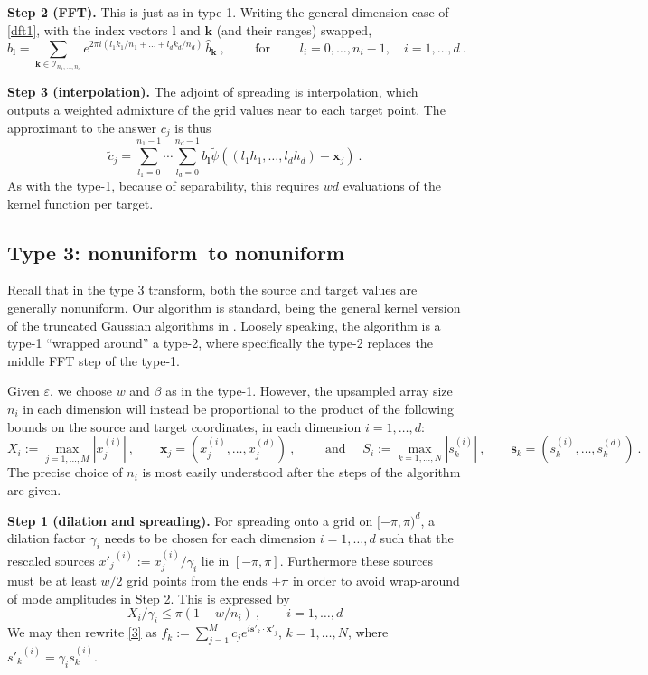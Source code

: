 \documentclass[10pt]{article}
\newcommand{\be}{\begin{equation}}
\newcommand{\ee}{\end{equation}}
\newcommand{\mbf}[1]{{\mathbf #1}}
\newcommand{\eps}{\varepsilon}
\newcommand{\xx}{\mbf{x}}
\newcommand{\sss}{\mbf{s}}
\newcommand{\kk}{\mbf{k}}
\newcommand{\KK}{{\mathcal I}}     %
\newcommand{\freq}{\beta}          %
\newcommand{\ppsi}{{\tilde\psi}}   %
\newcommand{\NU}{{nonuniform}}       %
\begin{document}
{\bf Step 2 (FFT).}
This is just as in type-1. Writing the general dimension
case of \eqref{dft1}, with the index vectors $\mbf{l}$
and $\kk$ (and their ranges) swapped,
\be
b_\mbf{l} = \sum_{\kk\in\KK_{n_1,\dots,n_d}}
e^{2\pi i (l_1k_1/n_1 + \dots + l_dk_d/n_d)}
\,\hat b_\kk ~, \qquad \mbox{ for }
\qquad l_i=0,\dots,n_i-1, \quad i=1,\dots,d
~.
\label{dft}
\ee

{\bf Step 3 (interpolation).}
The adjoint of spreading is interpolation, which
outputs a weighted admixture of the
grid values near to each target point.
The approximant to the answer $c_j$ is thus
\be
\tilde c_j = \sum_{l_1=0}^{n_1-1} \cdots \sum_{l_d=0}^{n_d-1}
b_\mbf{l} \ppsi((l_1h_1,\dots,l_dh_d) - \xx_j)
~.
\label{interp}
\ee
As with the type-1,
because of separability,
this requires $wd$ evaluations of the kernel function per target.



\subsection{Type 3: \NU\ to \NU}

Recall that in the type 3 transform,
both the source and target values are generally \NU.
Our algorithm is standard, being
the general kernel version of the truncated Gaussian algorithms in
\cite[Alg.~3]{nufft} \cite[Alg.~2]{elbel} \cite{nufft3}
\cite[Sec.~1.3]{nfftchap}.
Loosely speaking, the algorithm is a
type-1 ``wrapped around'' a type-2, where specifically
the type-2 replaces the middle FFT step of the type-1.

Given $\eps$, we choose $w$ and $\freq$ as in the type-1.
However, the upsampled array size $n_i$ in each dimension
will instead be proportional to the product of the following bounds on the
source and target coordinates,
in each dimension $i=1,\dots,d$:
\be
X_i := \max_{j=1,\dots,M} |x_j^{(i)}|
~,\qquad
\xx_j = (x_j^{(i)},\dots,x_j^{(d)})
~,\qquad\mbox{ and }
\quad
S_i := \max_{k=1,\dots,N} |s_k^{(i)}|
~,\qquad
\sss_k = (s_k^{(i)},\dots,s_k^{(d)})
~.
\label{XS}
\ee
The precise choice of $n_i$ is most easily understood after the
steps of the algorithm are given.

{\bf Step 1 (dilation and spreading).}
For spreading onto a grid on $[-\pi,\pi)^d$,
a dilation factor $\gamma_i$ needs to be chosen
for each dimension $i=1,\ldots,d$ 
such that the rescaled sources ${x'_j}^{(i)} := x_j^{(i)}/\gamma_i$
lie in $[-\pi,\pi]$. Furthermore these sources must be
at least $w/2$ grid points
from the ends $\pm\pi$ in order
to avoid wrap-around of mode amplitudes in Step 2.
This is expressed by
\be
X_i/\gamma_i \le \pi(1 - w/n_i)
~, \qquad i=1,\dots,d
\label{cond1}
\ee
We may then rewrite \eqref{3} as
$f_k := \sum_{j=1}^M c_j e^{i \sss'_k \cdot \xx'_j}$, $k=1,\dots, N$,
where ${s'_k}^{(i)} = \gamma_i s_k^{(i)}$.
\end{document}
